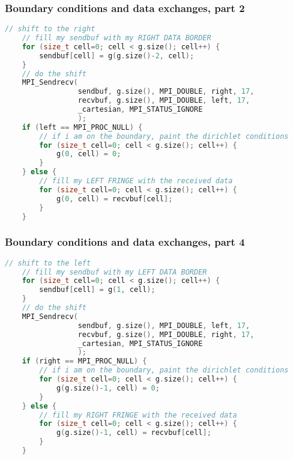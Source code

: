 \begin{frame}[fragile]
%
  \frametitle{Boundary conditions and data exchanges, part 2}
%
  \begin{lstlisting}[language=c++,name=mpi:example-impl]
    // shift to the right
    // fill my sendbuf with my RIGHT DATA BORDER
    for (size_t cell=0; cell < g.size(); cell++) {
        sendbuf[cell] = g(g.size()-2, cell); 
    }
    // do the shift 
    MPI_Sendrecv(
                 sendbuf, g.size(), MPI_DOUBLE, right, 17,
                 recvbuf, g.size(), MPI_DOUBLE, left, 17,
                 _cartesian, MPI_STATUS_IGNORE
                 );
    if (left == MPI_PROC_NULL) {
        // if i am on the boundary, paint the dirichlet conditions
        for (size_t cell=0; cell < g.size(); cell++) {
            g(0, cell) = 0;
        }
    } else {
        // fill my LEFT FRINGE with the received data
        for (size_t cell=0; cell < g.size(); cell++) {
            g(0, cell) = recvbuf[cell];
        }
    }
  \end{lstlisting}
% 
\end{frame}

\begin{frame}[fragile]
%
  \frametitle{Boundary conditions and data exchanges, part 4}
%
  \begin{lstlisting}[language=c++,name=mpi:example-impl]
    // shift to the left
    // fill my sendbuf with my LEFT DATA BORDER
    for (size_t cell=0; cell < g.size(); cell++) {
        sendbuf[cell] = g(1, cell);
    }
    // do the shift 
    MPI_Sendrecv(
                 sendbuf, g.size(), MPI_DOUBLE, left, 17,
                 recvbuf, g.size(), MPI_DOUBLE, right, 17,
                 _cartesian, MPI_STATUS_IGNORE
                 );
    if (right == MPI_PROC_NULL) {
        // if i am on the boundary, paint the dirichlet conditions
        for (size_t cell=0; cell < g.size(); cell++) {
            g(g.size()-1, cell) = 0;
        }
    } else {
        // fill my RIGHT FRINGE with the received data
        for (size_t cell=0; cell < g.size(); cell++) {
            g(g.size()-1, cell) = recvbuf[cell];
        }
    }
    
  \end{lstlisting}
% 
\end{frame}


